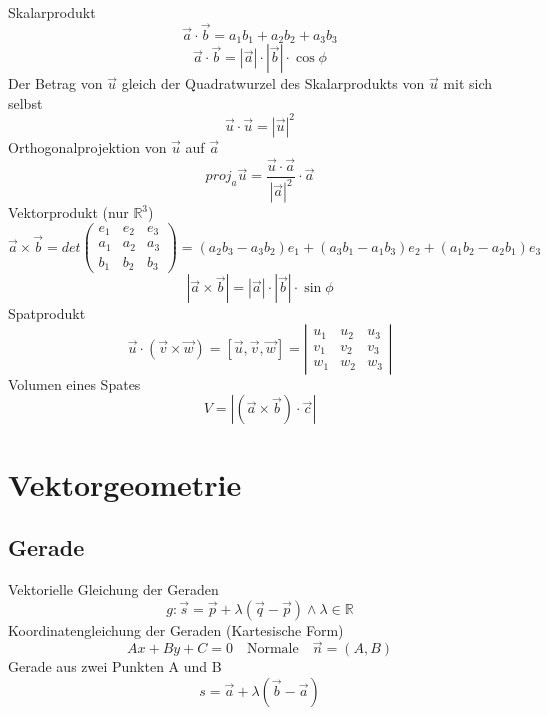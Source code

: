 \documentclass{report}
\begin{document}
Skalarprodukt
\begin{equation}\vec{a} \cdot \vec{b} = a_1b_1 + a_2b_2 + a_3b_3\end{equation}
\begin{equation}\vec{a} \cdot \vec{b} = |\vec{a}| \cdot |\vec{b}| \cdot \cos{\phi}\end{equation}
Der Betrag von $\vec{u}$ gleich der Quadratwurzel des Skalarprodukts von $\vec{u}$ mit sich selbst
\begin{equation}\vec{u} \cdot \vec{u} = {|\vec{u}|}^2\end{equation}
Orthogonalprojektion von $\vec{u}$ auf $\vec{a}$
\begin{equation}proj_a\vec{u} = \frac{\vec{u} \cdot \vec{a}}{{|\vec{a}|}^2} \cdot \vec{a}\end{equation}
Vektorprodukt (nur $\mathbb{R}^3$)
\begin{equation}\vec{a} \times \vec{b} = det\left(\begin{matrix}e_1 & e_2 & e_3 \\ a_1 & a_2 & a_3 \\ b_1 & b_2 & b_3\end{matrix}\right) = (a_2b_3-a_3b_2)e_1 + (a_3b_1-a_1b_3)e_2 + (a_1b_2-a_2b_1)e_3\end{equation}
\begin{equation}|\vec{a} \times \vec{b}| = |\vec{a}| \cdot |\vec{b}| \cdot \sin{\phi}\end{equation}
Spatprodukt
\begin{equation}\vec{u} \cdot (\vec{v} \times \vec{w}) = [\vec{u}, \vec{v}, \vec{w}] = \left|\begin{matrix}u_1 & u_2 & u_3 \\ v_1 & v_2 & v_3 \\ w_1 & w_2 & w_3\end{matrix}\right|\end{equation}
Volumen eines Spates
\begin{equation}V = |(\vec{a} \times \vec{b}) \cdot \vec{c}|\end{equation}
\newpage
\section{Vektorgeometrie}
\subsection{Gerade}
Vektorielle Gleichung der Geraden
\begin{equation}g: \vec{s} = \vec{p} + \lambda(\vec{q} - \vec{p}) \land \lambda \in \mathbb{R}\end{equation}
Koordinatengleichung der Geraden (Kartesische Form)
\begin{equation}Ax + By + C = 0 \quad \mbox{Normale} \quad \vec{n} = (A, B)\end{equation}
Gerade aus zwei Punkten A und B
\begin{equation}s = \vec{a} + \lambda (\vec{b} - \vec{a})\end{equation}
\end{document}
